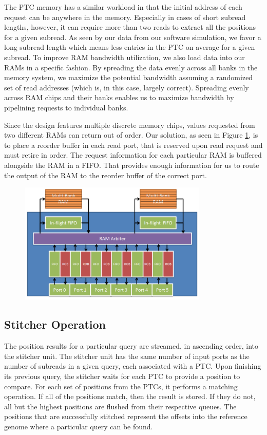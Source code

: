 \documentclass[11pt]{article}
\begin{document}
The PTC memory has a similar workload in that the initial address of each request can be anywhere in the memory.  Especially in cases of short subread lengths, however, it can require more than two reads to extract all the positions for a given subread.  As seen by our data from our software simulation, we favor a long subread length which means less entries in the PTC on average for a given subread.  To improve RAM bandwidth utilization, we also load data into our RAMs in a specific fashion.  By spreading the data evenly across all banks in the memory system, we maximize the potential bandwidth assuming a randomized set of read addresses (which is, in this case, largely correct).  Spreading evenly across RAM chips and their banks enables us to maximize bandwidth by pipelining requests to individual banks.

Since the design features multiple discrete memory chips, values requested from two different RAMs can return out of order.  Our solution, as seen in Figure \ref{rammodel}, is to place a reorder buffer in each read port, that is reserved upon read request and must retire in order.  The request information for each particular RAM is buffered alongside the RAM in a FIFO.  That provides enough information for us to route the output of the RAM to the reorder buffer of the correct port.  
\begin{figure}[ht!]
\centering
\includegraphics[width=90mm]{rammodel.png}
\caption{}
\label{rammodel}
\end{figure}

\subsection{Stitcher Operation}
The position results for a particular query are streamed, in ascending order, into the stitcher unit.  The stitcher unit has the same number of input ports as the number of subreads in a given query, each associated with a PTC.  Upon finishing its previous query, the stitcher waits for each PTC to provide a position to compare.  For each set of positions from the PTCs, it performs a matching operation.  If all of the positions match, then the result is stored.  If they do not, all but the highest positions are flushed from their respective queues.  The positions that are successfully stitched represent the offsets into the reference genome where a particular query can be found.
\end{document}
